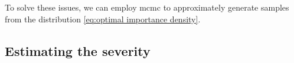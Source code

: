 To solve these issues, we can employ \ac{mcmc} \autocite{rubinstein2016simulation} to approximately generate samples from the distribution \cref{eq:optimal importance density}.




\subsection{Estimating the severity}
\label{sec:severity}

